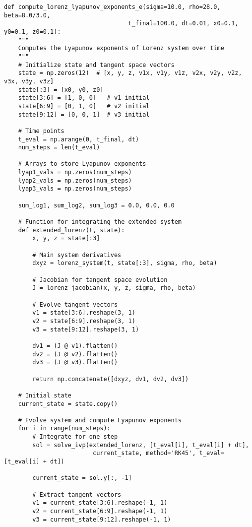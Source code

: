 \begin{lstlisting}[style=python]
def compute_lorenz_lyapunov_exponents_e(sigma=10.0, rho=28.0, beta=8.0/3.0, 
                                   t_final=100.0, dt=0.01, x0=0.1, y0=0.1, z0=0.1):
    """
    Computes the Lyapunov exponents of Lorenz system over time
    """
    # Initialize state and tangent space vectors
    state = np.zeros(12)  # [x, y, z, v1x, v1y, v1z, v2x, v2y, v2z, v3x, v3y, v3z]
    state[:3] = [x0, y0, z0]
    state[3:6] = [1, 0, 0]   # v1 initial
    state[6:9] = [0, 1, 0]   # v2 initial
    state[9:12] = [0, 0, 1]  # v3 initial
    
    # Time points
    t_eval = np.arange(0, t_final, dt)
    num_steps = len(t_eval)
    
    # Arrays to store Lyapunov exponents
    lyap1_vals = np.zeros(num_steps)
    lyap2_vals = np.zeros(num_steps)
    lyap3_vals = np.zeros(num_steps)
    
    sum_log1, sum_log2, sum_log3 = 0.0, 0.0, 0.0
    
    # Function for integrating the extended system
    def extended_lorenz(t, state):
        x, y, z = state[:3]
        
        # Main system derivatives
        dxyz = lorenz_system(t, state[:3], sigma, rho, beta)
        
        # Jacobian for tangent space evolution
        J = lorenz_jacobian(x, y, z, sigma, rho, beta)
        
        # Evolve tangent vectors
        v1 = state[3:6].reshape(3, 1)
        v2 = state[6:9].reshape(3, 1)
        v3 = state[9:12].reshape(3, 1)
        
        dv1 = (J @ v1).flatten()
        dv2 = (J @ v2).flatten()
        dv3 = (J @ v3).flatten()
        
        return np.concatenate([dxyz, dv1, dv2, dv3])
    
    # Initial state
    current_state = state.copy()
    
    # Evolve system and compute Lyapunov exponents
    for i in range(num_steps):
        # Integrate for one step
        sol = solve_ivp(extended_lorenz, [t_eval[i], t_eval[i] + dt], 
                         current_state, method='RK45', t_eval=[t_eval[i] + dt])
        
        current_state = sol.y[:, -1]
        
        # Extract tangent vectors
        v1 = current_state[3:6].reshape(-1, 1)
        v2 = current_state[6:9].reshape(-1, 1)
        v3 = current_state[9:12].reshape(-1, 1)
        

\end{lstlisting}
